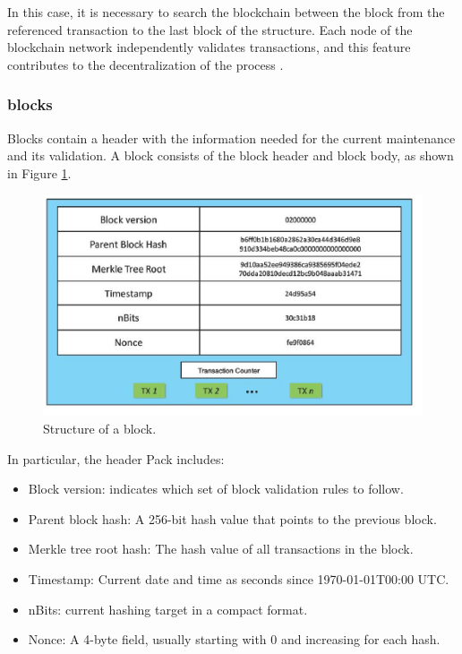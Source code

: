 In this case, it is necessary to search the blockchain between the block from the referenced transaction to the last block of the structure. Each node of the blockchain network independently validates transactions, and this feature contributes to the decentralization of the process \cite{greve2018blockchain}.

\subsubsection{blocks}\label{sec:blocks}
Blocks contain a header with the information needed for the current maintenance and its validation. A block consists of the block header and block body, as shown in Figure \ref{fig:block}. 

\begin{figure}[htbp]
\begin{center}
  \includegraphics[scale=0.5]{images/blockStructure.png}
\caption{Structure of a block. \cite{zheng2016blockchain}}
\label{fig:block}
\end{center}
\end{figure}

In particular, the header Pack includes:

\begin{itemize}
\item Block version: indicates which set of block validation rules to follow.
\item Parent block hash: A 256-bit hash value that points to the previous block.
\item Merkle tree root hash: The hash value of all transactions in the block.
\item Timestamp: Current date and time as seconds since 1970-01-01T00:00 UTC.
\item  nBits: current hashing target in a compact format.
\item Nonce: A 4-byte field, usually starting with 0 and increasing for each hash.
\end{itemize}

